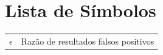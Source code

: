 \documentclass[12pt,twoside,english,brazilian]{book}
\begin{document}
\makeatletter
\if@openright\cleardoublepage\else\clearpage\fi
\makeatother


\newcommand\disablenewpage[1]{{\let\clearpage\par\let\cleardoublepage\par #1}}

\bgroup
\raggedbottom


\disablenewpage{\chapter*{Lista de Símbolos}}

\begin{tabular}{rl}
  $\epsilon$ & Razão de resultados falsos positivos\\
\end{tabular}

\clearpage
\end{document}
